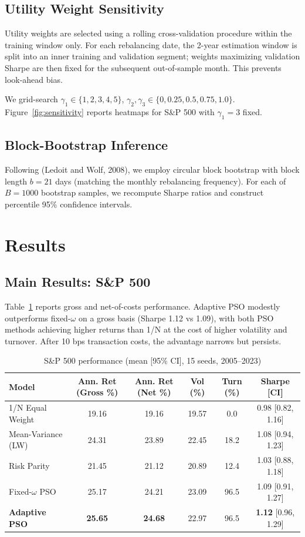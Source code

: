 \documentclass[12pt,a4paper]{article}
\begin{document}
	\subsection{Utility Weight Sensitivity}
	
	Utility weights are selected using a rolling cross-validation procedure within the training window only. For each rebalancing date, the 2-year estimation window is split into an inner training and validation segment; weights maximizing validation Sharpe are then fixed for the subsequent out-of-sample month. This prevents look-ahead bias.
	
	We grid-search $\gamma_1\in\{1,2,3,4,5\}$, $\gamma_2,\gamma_3\in\{0,0.25,0.5,0.75,1.0\}$. Figure~\ref{fig:sensitivity} reports heatmaps for S\&P 500 with $\gamma_1=3$ fixed.
	
	\subsection{Block-Bootstrap Inference}
	
	Following (Ledoit and Wolf, 2008), we employ circular block bootstrap with block length $b=21$ days (matching the monthly rebalancing frequency). For each of $B=1000$ bootstrap samples, we recompute Sharpe ratios and construct percentile 95\% confidence intervals.
	
	\section{Results}
	
	\subsection{Main Results: S\&P 500}
	
	Table~\ref{tab:main} reports gross and net-of-costs performance. Adaptive PSO modestly outperforms fixed-$\omega$ on a gross basis (Sharpe 1.12 vs 1.09), with both PSO methods achieving higher returns than 1/N at the cost of higher volatility and turnover. After 10 bps transaction costs, the advantage narrows but persists.
	
	\begin{table}[!t]
		\centering
		\scriptsize 
		\caption{S\&P 500 performance (mean [95\% CI], 15 seeds, 2005--2023)}\label{tab:main}
		\begin{tabular}{@{}lccccc@{}}
			\toprule
			Model & Ann. Ret (Gross \%) & Ann. Ret (Net \%) & Vol (\%) & Turn (\%) & Sharpe [CI]\\
			\midrule
			1/N Equal Weight & 19.16 & 19.16 & 19.57 & 0.0 & 0.98 [0.82, 1.16]\\
			Mean-Variance (LW) & 24.31 & 23.89 & 22.45 & 18.2 & 1.08 [0.94, 1.23]\\
			Risk Parity & 21.45 & 21.12 & 20.89 & 12.4 & 1.03 [0.88, 1.18]\\
			Fixed-$\omega$ PSO & 25.17 & 24.21 & 23.09 & 96.5 & 1.09 [0.91, 1.27]\\
			\textbf{Adaptive PSO} & \textbf{25.65} & \textbf{24.68} & 22.97 & 96.5 & \textbf{1.12} [0.96, 1.29]\\
			\bottomrule
		\end{tabular}
	\end{table}
	
\end{document}
